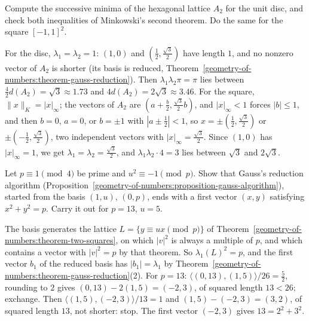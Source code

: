 \begin{exercise}\label{geometry-of-numbers:exercise-a2-minima}
Compute the successive minima of the hexagonal lattice $A_2$ for the unit disc, and check both inequalities of Minkowski's second theorem. Do the same for the square $[-1, 1]^2$.
\end{exercise}

\begin{solution}
For the disc, $\lambda_1 = \lambda_2 = 1$: $(1, 0)$ and $(\frac12, \frac{\sqrt3}{2})$ have length $1$, and no nonzero vector of $A_2$ is shorter (its basis is reduced, Theorem~\ref{geometry-of-numbers:theorem-gauss-reduction}).
Then $\lambda_1\lambda_2\pi = \pi$ lies between $\frac{4}{2}d(A_2) = \sqrt3 \approx 1.73$ and $4d(A_2) = 2\sqrt3 \approx 3.46$. For the square, $\|x\|_K = |x|_\infty$; the vectors of $A_2$ are
$(a + \frac b2, \frac{\sqrt3}{2}b)$, and $|x|_\infty < 1$ forces $|b| \leq 1$, and then $b = 0$, $a = 0$, or $b = \pm1$ with $|a \pm \frac12| < 1$, so $x = \pm(\frac12, \frac{\sqrt3}{2})$ or $\pm(-\frac12, \frac{\sqrt3}{2})$,
two independent vectors with $|x|_\infty = \frac{\sqrt3}{2}$. Since $(1, 0)$ has $|x|_\infty = 1$, we get $\lambda_1 = \lambda_2 = \frac{\sqrt3}{2}$, and $\lambda_1\lambda_2\cdot 4 = 3$ lies between $\sqrt3$ and $2\sqrt3$.
\end{solution}

\begin{exercise}\label{geometry-of-numbers:exercise-cornacchia}
Let $p \equiv 1 \pmod 4$ be prime and $u^2 \equiv -1 \pmod p$. Show that Gauss's reduction algorithm (Proposition~\ref{geometry-of-numbers:proposition-gauss-algorithm}), started from the basis $(1, u)$,
$(0, p)$, ends with a first vector $(x, y)$ satisfying $x^2 + y^2 = p$. Carry it out for $p = 13$, $u = 5$.
\end{exercise}

\begin{solution}
The basis generates the lattice $L = \{y \equiv ux \pmod p\}$ of Theorem~\ref{geometry-of-numbers:theorem-two-squares}, on which $|v|^2$ is always a multiple of $p$, and which contains a vector with
$|v|^2 = p$ by that theorem. So $\lambda_1(L)^2 = p$, and the first vector $b_1$ of the reduced basis has $|b_1| = \lambda_1$ by Theorem~\ref{geometry-of-numbers:theorem-gauss-reduction}(2). For $p = 13$:
$\langle(0, 13), (1, 5)\rangle/26 = \frac52$, rounding to $2$ gives $(0, 13) - 2(1, 5) = (-2, 3)$, of squared length $13 < 26$; exchange. Then $\langle(1, 5), (-2, 3)\rangle/13 = 1$ and
$(1, 5) - (-2, 3) = (3, 2)$, of squared length $13$, not shorter: stop. The first vector $(-2, 3)$ gives $13 = 2^2 + 3^2$.
\end{solution}

